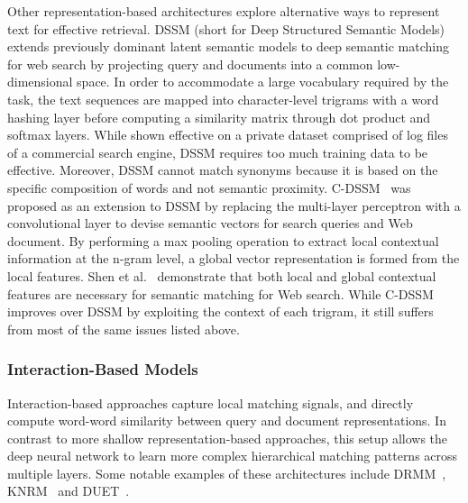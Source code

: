 Other representation-based architectures explore alternative ways to represent text for effective retrieval.
DSSM (short for Deep Structured Semantic Models)~\cite{huang2013learning} extends previously dominant latent semantic models to deep semantic matching for web search by projecting query and documents into a common low-dimensional space.
In order to accommodate a large vocabulary required by the task, the text sequences are mapped into character-level trigrams with a word hashing layer before computing a similarity matrix through dot product and softmax layers.
While shown effective on a private dataset comprised of log files of a commercial search engine, DSSM requires too much training data to be effective.
Moreover, DSSM cannot match synonyms because it is based on the specific composition of words and not semantic proximity.
C-DSSM~\cite{shen2014learning} was proposed as an extension to DSSM by replacing the multi-layer perceptron with a convolutional layer to devise semantic vectors for search queries and Web document.
By performing a max pooling operation to extract local contextual information at the n-gram level, a global vector representation is formed from the local features.
Shen et al.~\cite{shen2014learning} demonstrate that both local and global contextual features are necessary for semantic matching for Web search.
While C-DSSM improves over DSSM by exploiting the context of each trigram, it still suffers from most of the same issues listed above.

\subsubsection{Interaction-Based Models}

Interaction-based approaches capture local matching signals, and directly compute word-word similarity between query and document representations.
In contrast to more shallow representation-based approaches, this setup allows the deep neural network to learn more complex hierarchical matching patterns across multiple layers.
Some notable examples of these architectures include DRMM~\cite{guo2017drmm}, KNRM~\cite{xiong2017knrm} and DUET~\cite{mitra2017learning}.

